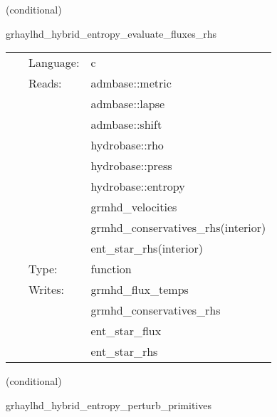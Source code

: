 \vspace{5mm}

   (conditional) 

\hspace{5mm} grhaylhd\_hybrid\_entropy\_evaluate\_fluxes\_rhs 

\hspace{5mm}{\it entropy+hybrid version of grhaylhd\_evaluate\_fluxes\_rhs } 


\hspace{5mm}

 \begin{tabular*}{160mm}{cll} 
~ & Language:  & c \\ 
~ & Reads:  & admbase::metric \\ 
~& ~ &admbase::lapse\\ 
~& ~ &admbase::shift\\ 
~& ~ &hydrobase::rho\\ 
~& ~ &hydrobase::press\\ 
~& ~ &hydrobase::entropy\\ 
~& ~ &grmhd\_velocities\\ 
~& ~ &grmhd\_conservatives\_rhs(interior)\\ 
~& ~ &ent\_star\_rhs(interior)\\ 
~ & Type:  & function \\ 
~ & Writes:  & grmhd\_flux\_temps \\ 
~& ~ &grmhd\_conservatives\_rhs\\ 
~& ~ &ent\_star\_flux\\ 
~& ~ &ent\_star\_rhs\\ 
\end{tabular*} 


\vspace{5mm}

   (conditional) 

\hspace{5mm} grhaylhd\_hybrid\_entropy\_perturb\_primitives 

\hspace{5mm}{\it entropy+hybrid version of grhaylhd\_perturb\_primitives } 


\hspace{5mm}

